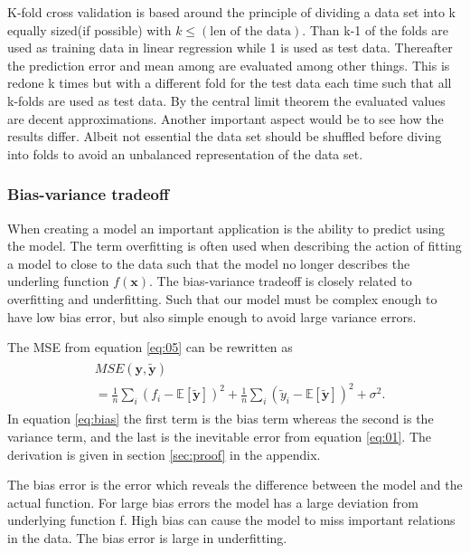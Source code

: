 \documentclass[uio,jmp,amsmath,amssymb,reprint,nofootinbib]{revtex4-1}
\numberwithin{equation}{section}
\begin{document}
K-fold cross validation is based around the principle of dividing a data set into k equally sized(if possible) with \(k \leq (\text{len of the data})\). Than k-1 of the folds are used as training data in linear regression while 1 is used as test data. Thereafter the prediction error and mean among are evaluated among other things. This is redone k times but with a different fold for the test data each time such that all k-folds are used as test data. By the central limit theorem the evaluated values are decent approximations. Another important aspect would be to see how the results differ. Albeit not essential the data set should be shuffled before diving into folds to avoid an unbalanced representation of the data set.


\subsubsection{Bias-variance tradeoff}

When creating a model an important application is the ability to predict using the model. The term overfitting is often used when describing the action of fitting a model to close to the data such that the model no longer describes the underling function \(f(\bm{x})\). The bias-variance tradeoff is closely related to overfitting and underfitting. Such that our model must be complex enough to have low bias error, but also simple enough to avoid large variance errors.

The MSE from equation \ref{eq:05} can be rewritten as
\begin{align}\label{eq:bias}
\begin{split}
&MSE(\bm{y}, \bm{\tilde{y}}) \\
&= \frac{1}{n}\sum_i(f_i-\mathbb{E}\left[\boldsymbol{\tilde{y}}\right])^2+\frac{1}{n}\sum_i(\tilde{y}_i-\mathbb{E}\left[\boldsymbol{\tilde{y}}\right])^2+\sigma^2.
\end{split}
\end{align}
In equation \ref{eq:bias} the first term is the bias term whereas the second is the variance term, and the last is the inevitable error from equation \ref{eq:01}. The derivation is given in section \ref{sec:proof} in the appendix.

The bias error is the error which reveals the difference between the model and the actual function. For large bias errors the model has a large deviation from underlying function f. High bias can cause the model to miss important relations in the data. The bias error is large in underfitting.
\end{document}
